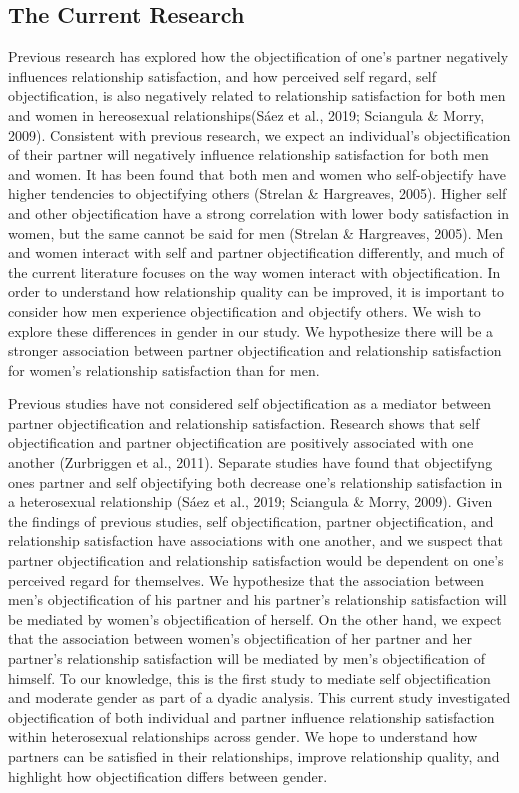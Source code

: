 \documentclass[
  man]{apa6}
\begin{document}
\hypertarget{the-current-research}{%
\subsection{The Current Research}\label{the-current-research}}

Previous research has explored how the objectification of one's partner negatively influences relationship satisfaction, and how perceived self regard, self objectification, is also negatively related to relationship satisfaction for both men and women in hereosexual relationships(Sáez et al., 2019; Sciangula \& Morry, 2009). Consistent with previous research, we expect an individual's objectification of their partner will negatively influence relationship satisfaction for both men and women. It has been found that both men and women who self-objectify have higher tendencies to objectifying others (Strelan \& Hargreaves, 2005). Higher self and other objectification have a strong correlation with lower body satisfaction in women, but the same cannot be said for men (Strelan \& Hargreaves, 2005). Men and women interact with self and partner objectification differently, and much of the current literature focuses on the way women interact with objectification. In order to understand how relationship quality can be improved, it is important to consider how men experience objectification and objectify others. We wish to explore these differences in gender in our study. We hypothesize there will be a stronger association between partner objectification and relationship satisfaction for women's relationship satisfaction than for men.

Previous studies have not considered self objectification as a mediator between partner objectification and relationship satisfaction. Research shows that self objectification and partner objectification are positively associated with one another (Zurbriggen et al., 2011). Separate studies have found that objectifyng ones partner and self objectifying both decrease one's relationship satisfaction in a heterosexual relationship (Sáez et al., 2019; Sciangula \& Morry, 2009). Given the findings of previous studies, self objectification, partner objectification, and relationship satisfaction have associations with one another, and we suspect that partner objectification and relationship satisfaction would be dependent on one's perceived regard for themselves. We hypothesize that the association between men's objectification of his partner and his partner's relationship satisfaction will be mediated by women's objectification of herself. On the other hand, we expect that the association between women's objectification of her partner and her partner's relationship satisfaction will be mediated by men's objectification of himself. To our knowledge, this is the first study to mediate self objectification and moderate gender as part of a dyadic analysis. This current study investigated objectification of both individual and partner influence relationship satisfaction within heterosexual relationships across gender. We hope to understand how partners can be satisfied in their relationships, improve relationship quality, and highlight how objectification differs between gender.
\end{document}
